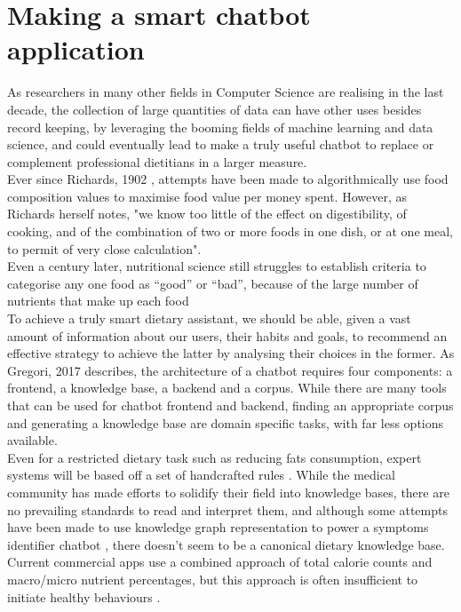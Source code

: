\section{Making a smart chatbot application}
As researchers in many other fields in Computer Science are realising in the last decade, the collection of large quantities of data can have other uses besides record keeping, by leveraging the booming fields of machine learning and data science, and could eventually lead to make a truly useful chatbot to replace or complement professional dietitians in a larger measure. \\
Ever since Richards, 1902 \cite{Richards1902a}, attempts have been made to algorithmically use food composition values to maximise food value per money spent. However, as Richards herself notes, "we know too little of the effect on digestibility, of cooking, and of the combination of two or more foods in one dish, or at one meal, to permit of very close calculation". \\
Even a century later, nutritional science still struggles to establish criteria to categorise any one food as ``good'' or ``bad'', because of the large number of nutrients that make up each food \cite{USDAFoodandNutritionService2007} \\
To achieve a truly smart dietary assistant, we should be able, given a vast amount of information about our users, their habits and goals, to recommend an effective strategy to achieve the latter by analysing their choices in the former. As Gregori, 2017 \cite{Gregori} describes, the architecture of a chatbot requires four components: a frontend, a knowledge base, a backend and a corpus. While there are many tools that can be used for chatbot frontend and backend, finding an appropriate corpus and generating a knowledge base are domain specific tasks, with far less options available. \\
Even for a restricted dietary task such as reducing fats consumption, expert systems will be based off a set of handcrafted rules \cite{Prochaska2005}. While the medical community has made efforts to solidify their field into knowledge bases, there are no prevailing standards to read and interpret them, and although some attempts have been made to use knowledge graph representation to power a symptoms identifier chatbot \cite{minutoloa2017conversational}, there doesn't seem to be a canonical dietary knowledge base. Current commercial apps use a combined approach of total calorie counts and macro/micro nutrient percentages, but this approach is often insufficient to initiate healthy behaviours \cite{Davis2016}.
